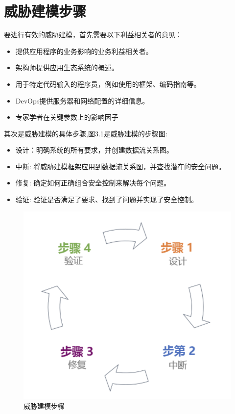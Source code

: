   \section{威胁建模步骤}
要进行有效的威胁建模，首先需要以下利益相关者的意见：
  \begin{itemize}
    \item 提供应用程序的业务影响的业务利益相关者。
    \item 架构师提供应用生态系统的概述。
    \item 用于特定代码输入的程序员，例如使用的框架、编码指南等。
    \item DevOps提供服务器和网络配置的详细信息。
    \item 专家学者在关键参数上的影响因子
  \end{itemize}
  其次是威胁建模的具体步骤,图3.1是威胁建模的步骤图:
  \begin{itemize}
    \item 设计：明确系统的所有要求，并创建数据流关系图。
    \item 中断: 将威胁建模框架应用到数据流关系图，并查找潜在的安全问题。
    \item 修复: 确定如何正确组合安全控制来解决每个问题。
    \item 验证: 验证是否满足了要求、找到了问题并实现了安全控制。
  \end{itemize}
  \begin{figure}
    \centering
    \includegraphics[scale=0.6]{resources/img/i4.png}
    \caption{威胁建模步骤}
  \end{figure}

